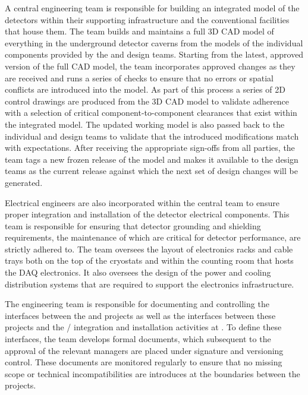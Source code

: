 A central  engineering team is responsible for building an
integrated model of the detectors within their supporting
infrastructure and the conventional facilities that house them.  The
team builds and maintains a full 3D CAD model of everything in the
underground detector caverns from the models of the individual
components provided by the  and  design teams.
Starting from the latest, approved version of the full CAD model, the
 team incorporates approved changes as they are received
and runs a series of checks to ensure that no errors or spatial
conflicts are introduced into the model.  As part of this process a
series of 2D control drawings are produced from the 3D CAD model to
validate adherence with a selection of critical component-to-component
clearances that exist within the integrated model.  The updated
working model is also passed back to the individual  and
 design teams to validate that the introduced
modifications match with expectations.  After receiving the
appropriate sign-offs from all parties, the  team tags a
new frozen release of the model and makes it available to the design
teams as the current release against which the next set of design
changes will be generated.

Electrical engineers are also incorporated within the central
 team to ensure proper integration and installation of the
detector electrical components.  This team is responsible for ensuring
that detector grounding and shielding requirements, the maintenance of
which are critical for detector performance, are strictly adhered to.
The team oversees the layout of electronics racks and cable trays both
on the top of the cryostats and within the  counting room
that hosts the DAQ electronics.  It also oversees the design of the
power and cooling distribution systems that are required to support
the electronics infrastructure.

The  engineering team is responsible for documenting and
controlling the interfaces between the  and  projects as well
as the interfaces between these projects and the / integration
and installation activities at .  To define these interfaces, the
 team develops formal documents, which subsequent to the approval
of the relevant managers are placed under signature and versioning
control.  These documents are monitored regularly to ensure that no
missing scope or technical incompatibilities are introduces at the
boundaries between the projects.



